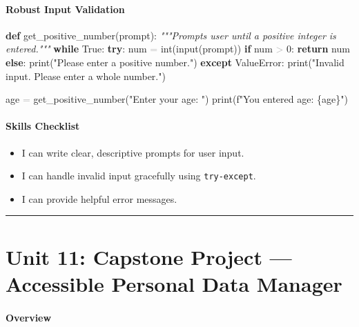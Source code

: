 \documentclass[
  justified,
  openright,
]{tufte-book}
\let\subsection\paragraph
\let\paragraph\paragraph
\newcommand{\KeywordTok}[1]{\textcolor{CodeKeyword}{\textbf{#1}}}  %
\newcommand{\StringTok}[1]{\textcolor{CodeString}{#1}}              %
\newcommand{\CommentTok}[1]{\textcolor{CodeComment}{\textit{#1}}}  %
\newcommand{\CodeNumTok}[1]{\textcolor{CodeNumber}{#1}}             %
\newcommand{\CodeAccentTok}[1]{\textcolor{CodeAccent}{#1}}          %
\newcommand{\OperatorTok}[1]{\textcolor{DarkGray}{#1}}              %
\newenvironment{Shaded}{%
  \begin{mdframed}[style=TufteCode]%
}{%
  \end{mdframed}%
}
\let\subsection\paragraph
\let\paragraph\paragraph
\providecommand{\tightlist}{%
  \setlength{\itemsep}{0pt}\setlength{\parskip}{0pt}}
\begin{document}
\subsection{Robust Input Validation}\label{robust-input-validation}

\begin{Shaded}
\begin{Highlighting}[]
\KeywordTok{def} get\_positive\_number(prompt):
    \CommentTok{"""Prompts user until a positive integer is entered."""}
    \KeywordTok{while} True:
        \KeywordTok{try}:
            num \OperatorTok{=} int(input(prompt))
            \KeywordTok{if} num \OperatorTok{\textgreater{}} \CodeNumTok{0}:
                \KeywordTok{return} num
            \KeywordTok{else}:
                print(\StringTok{"Please enter a positive number."})
        \KeywordTok{except} \CodeAccentTok{ValueError}:
            print(\StringTok{"Invalid input. Please enter a whole number."})
 
 
age \OperatorTok{=} get\_positive\_number(\StringTok{"Enter your age: "})
print(\StringTok{f"You entered age: }\StringTok{\{}age\StringTok{\}}\StringTok{"})
\end{Highlighting}
\end{Shaded}

\subsection{Skills Checklist}\label{skills-checklist-51}

\begin{itemize}
\tightlist
\item[$\square$]
  I can write clear, descriptive prompts for user input.
\item[$\square$]
  I can handle invalid input gracefully using \texttt{try-except}.
\item[$\square$]
  I can provide helpful error messages.
\end{itemize}

\begin{center}\rule{0.5\linewidth}{0.5pt}\end{center}

\section{Unit 11: Capstone Project --- Accessible Personal Data
Manager}\label{unit-11-capstone-project-accessible-personal-data-manager}

\subsection{Overview}\label{overview-11}
\end{document}
